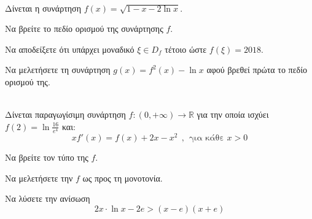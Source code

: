 \documentclass[twoside,nofonts,internet,math,spyros]{frontisthrio-diag}
\begin{document}
\begin{thema}
\begin{erwthma}
\end{erwthma}
\item \mbox{}\\
Δίνεται η συνάρτηση $ f(x)=\sqrt{1-x-2\ln{x}} $.
\begin{erwthma}
\item Να βρείτε το πεδίο ορισμού της συνάρτησης $ f $.
\item Να αποδείξετε ότι υπάρχει μοναδικό $ \xi\in D_f $ τέτοιο ώστε $ f(\xi)=2018 $.
\item Να μελετήσετε τη συνάρτηση $ g(x)=f^2(x)-\ln{x} $ αφού βρεθεί πρώτα το πεδίο ορισμού της.
\end{erwthma}
\item \mbox{}\\
Δίνεται παραγωγίσιμη συνάρτηση $ f:(0,+\infty)\to\mathbb{R} $ για την οποία ισχύει $ f(2)=\ln{\frac{16}{e^4}} $ και:
\[ xf'(x)=f(x)+2x-x^2\ \ ,\ \ \textrm{για κάθε }x>0 \]
\begin{erwthma}
\item Να βρείτε τον τύπο της $ f $.
\item Να μελετήσετε την $ f $ ως προς τη μονοτονία.
\item Να λύσετε την ανίσωση \[ 2x\cdot\ln{x}-2e>(x-e)(x+e) \]
\end{erwthma}
\end{thema}
\kaliepityxia
\end{document}
